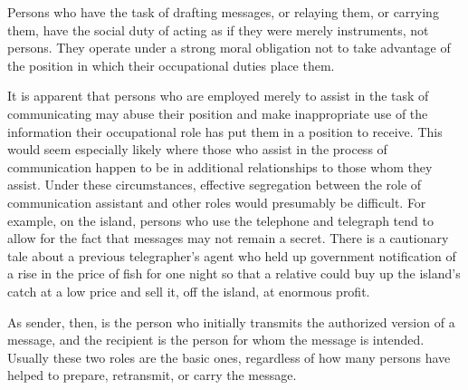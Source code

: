 \documentclass[twoside,symmetric,nobib,justified]{tufte-book}
\begin{document}
Persons who have the task of drafting messages, or relaying them, or
carrying them, have the social duty of acting as if they were merely
instruments, not persons. They operate under a strong moral obligation
not to take advantage of the position in which their occupational duties
place them.

It is apparent that persons who are employed merely to assist in the
task of communicating may abuse their position and make inappropriate
use of the information their occupational role has put them in a
position to receive. This would seem especially likely where those who
assist in the process of communication happen to be in additional
relationships to those whom they assist. Under these circumstances,
effective segregation between the role of communication assistant and
other roles would presumably be difficult. For example, on the island,
persons who use the telephone and telegraph tend to allow for the fact
that messages may not remain a secret. There is a cautionary tale about
a previous telegrapher's agent who held up government notification of a
rise in the price of fish for one night so that a relative could buy up
the island's catch at a low price and sell it, off the island, at
enormous profit.

As sender, then, is the person who initially transmits the authorized
version of a message, and the recipient is the person for whom the
message is intended. Usually these two roles are the basic ones,
regardless of how many persons have helped to prepare, retransmit, or
carry the message.
\end{document}
